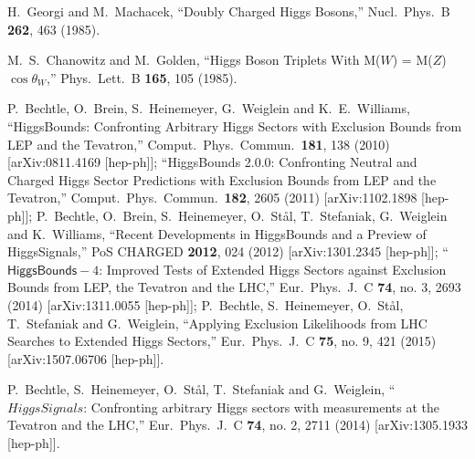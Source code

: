 \documentclass[11pt]{article}
\begin{document}
\begin{thebibliography}{99}

  H.~Georgi and M.~Machacek,
  ``Doubly Charged Higgs Bosons,''
  Nucl.\ Phys.\ B {\bf 262}, 463 (1985).
  
  M.~S.~Chanowitz and M.~Golden,
  ``Higgs Boson Triplets With M($W$) = M($Z$) $\cos \theta_W$,''
  Phys.\ Lett.\ B {\bf 165}, 105 (1985).

  P.~Bechtle, O.~Brein, S.~Heinemeyer, G.~Weiglein and K.~E.~Williams,
  ``HiggsBounds: Confronting Arbitrary Higgs Sectors with Exclusion Bounds from LEP and the Tevatron,''
  Comput.\ Phys.\ Commun.\  {\bf 181}, 138 (2010)
  [arXiv:0811.4169 [hep-ph]];
  ``HiggsBounds 2.0.0: Confronting Neutral and Charged Higgs Sector Predictions with Exclusion Bounds from LEP and the Tevatron,''
  Comput.\ Phys.\ Commun.\  {\bf 182}, 2605 (2011)
  [arXiv:1102.1898 [hep-ph]];
  P.~Bechtle, O.~Brein, S.~Heinemeyer, O.~St{\aa}l, T.~Stefaniak, G.~Weiglein and K.~Williams,
  ``Recent Developments in HiggsBounds and a Preview of HiggsSignals,''
  PoS CHARGED {\bf 2012}, 024 (2012)
  [arXiv:1301.2345 [hep-ph]];
  ``$\mathsf{HiggsBounds}-4$: Improved Tests of Extended Higgs Sectors against Exclusion Bounds from LEP, the Tevatron and the LHC,''
  Eur.\ Phys.\ J.\ C {\bf 74}, no. 3, 2693 (2014)
  [arXiv:1311.0055 [hep-ph]];
  P.~Bechtle, S.~Heinemeyer, O.~St{\aa}l, T.~Stefaniak and G.~Weiglein,
  ``Applying Exclusion Likelihoods from LHC Searches to Extended Higgs Sectors,''
  Eur.\ Phys.\ J.\ C {\bf 75}, no. 9, 421 (2015)
  [arXiv:1507.06706 [hep-ph]].

  P.~Bechtle, S.~Heinemeyer, O.~St{\aa}l, T.~Stefaniak and G.~Weiglein,
  ``$HiggsSignals$: Confronting arbitrary Higgs sectors with measurements at the Tevatron and the LHC,''
  Eur.\ Phys.\ J.\ C {\bf 74}, no. 2, 2711 (2014)
  [arXiv:1305.1933 [hep-ph]].
  

\end{thebibliography}
\end{document}
